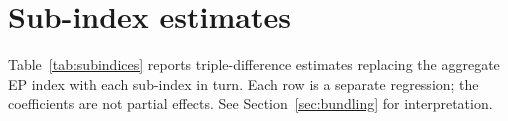 \documentclass[12pt]{article}
\begin{document}


\section{Sub-index estimates}\label{app:subindices}

Table~\ref{tab:subindices} reports triple-difference estimates replacing the aggregate EP
index with each sub-index in turn. Each row is a separate regression; the coefficients
are not partial effects. See Section~\ref{sec:bundling} for interpretation.


\end{document}
